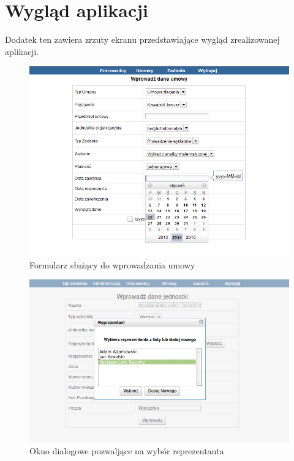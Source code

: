 \chapter{Wygląd aplikacji}
Dodatek ten zawiera zrzuty ekranu przedstawiające wygląd zrealizowanej aplikacji.

\begin{figure}[]
    \begin{center}
	\includegraphics[scale=1,angle=-90]{img/screen1.png}
	\caption{Formularz służący do wprowadzania umowy}
	\label{screen1}
    \end{center}
\end{figure}

\begin{figure}[]
    \begin{center}
	\includegraphics[scale=1,angle=-90]{img/screen2.png}
	\caption{Okno dialogowe pozwaljące na wybór reprezentanta}
	\label{screen2}
    \end{center}
\end{figure}

